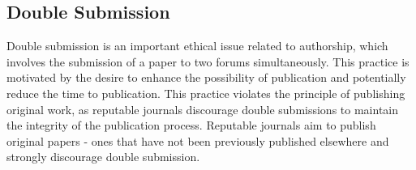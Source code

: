 \documentclass{article}
\begin{document}
	\subsection{Double Submission}
	Double submission is an important ethical issue related to authorship, which involves the submission of a
	paper to two forums simultaneously.
	This practice is motivated by the desire to enhance the possibility of publication and potentially reduce
	the time to publication.
	This practice violates the principle of publishing original work, as reputable journals discourage double
	submissions to maintain the integrity of the publication process.
	Reputable journals aim to publish original papers - ones that have not been previously published
	elsewhere and strongly discourage double submission.
\end{document}
